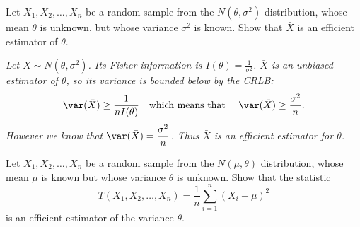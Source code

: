 \begin{example}
Let $X_1,X_2,\ldots,X_n$ be a random sample from the $N(\theta,\sigma^2)$ distribution, whose mean $\theta$ is unknown, but whose variance $\sigma^2$ is known. Show that $\bar{X}$ is an efficient estimator of $\theta$.
\end{example}
\begin{solution}
\bit
\it
Let $X\sim N(\theta,\sigma^2)$. Its Fisher information is $I(\theta) = \displaystyle\frac{1}{\sigma^2}$.
\it $\bar{X}$ is an unbiased estimator of $\theta$, so its variance is bounded below by the CRLB:
\[
\var(\bar{X}) \geq \frac{1}{nI(\theta)} 
\text{\quad which means that \quad}
\var(\bar{X}) \geq \frac{\sigma^2}{n}.
\]
\it
However we know that $\var(\bar{X}) = \displaystyle\frac{\sigma^2}{n}$. Thus $\bar{X}$ is an efficient estimator for $\theta$.
\eit
\end{solution}

\begin{example}
Let $X_1,X_2,\ldots,X_n$ be a random sample from the $N(\mu,\theta)$ distribution, whose mean $\mu$ is known but whose variance $\theta$ is unknown. Show that the statistic
\[
T(X_1,X_2,\ldots,X_n) = \frac{1}{n}\sum_{i=1}^{n} (X_i-\mu)^2 
\]
is an efficient estimator of the variance $\theta$.
\end{example}


